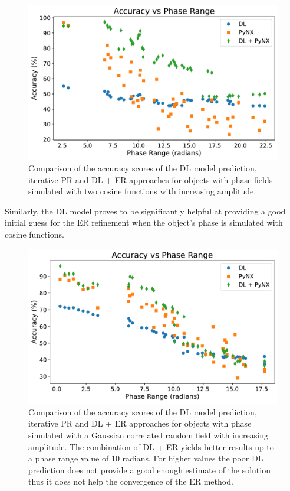 \begin{figure}[H]
    \centering
    \includegraphics[width=\textwidth]{figures/Phasing/plot_acc_comparison_cosine.pdf}
    \caption{Comparison of the accuracy scores of the DL model prediction, iterative PR and DL + ER approaches for objects with 
    phase fields simulated with two cosine functions with increasing amplitude. }
    \label{fig:compare_cosine}
\end{figure}

Similarly, the DL model proves to be significantly helpful at providing a good initial guess for the ER refinement when 
the object's phase is simulated with cosine functions. 

\begin{figure}[H]
    \centering
    \includegraphics[width=\textwidth]{figures/Phasing/plot_acc_comparison.pdf}
    \caption{Comparison of the accuracy scores of the DL model prediction, iterative PR and DL + ER approaches for objects with 
    phase simulated with a Gaussian correlated random field with increasing amplitude. The combination of DL + ER yields better 
    results up to a phase range value of 10 radians. For higher values the poor DL prediction does not provide a good enough 
    estimate of the solution thus it does not help the convergence of the ER method. }
    \label{fig:compare_random}
\end{figure}

